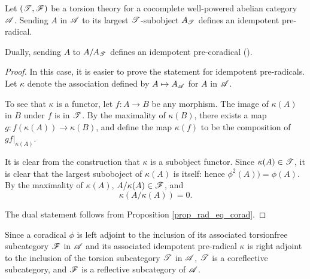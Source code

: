 \begin{prop}\label{prop_tt_to_corad}
  Let $(\mathscr{T}, \mathscr{F})$ be a torsion theory for a cocomplete
  well-powered abelian category $\mathscr{A}$.  Sending $A$ in $\mathscr{A}$
  to its largest $\mathscr{T}$-subobject $A_{\mathscr{T}}$ defines an
  idempotent pre-radical.

Dually, sending $A$ to $A/A_{\mathscr{T}}$ defines an idempotent 
pre-coradical (\CF \cite[I2.8]{BJV}).
\end{prop}
\begin{proof}
In this case, it is easier to prove the statement for idempotent 
pre-radicals. Let $\kappa$ denote the association defined by $A 
\mapsto A_{\mathscr{A}}$ for $A$ in $\mathscr{A}$.

To see that $\kappa$ is a functor, let $f: A \to B$ be any 
morphism. The image of $\kappa(A)$ in $B$ under $f$ is in 
$\mathscr{T}$. By the maximality of $\kappa(B)$, there exists a map 
$g: f(\kappa(A)) \to \kappa(B)$, and define the map $\kappa(f)$ 
to be the composition of $g f|_{\kappa(A)}$.

It is clear from the construction that $\kappa$ is a subobject 
functor. Since $\kappa(A) \in \mathscr{T}$, it is clear that the 
largest suboboject of $\kappa(A)$ is itself: hence $\phi^2(A)) = 
\phi(A)$. By the maximality of $\kappa(A)$, $A/\kappa(A) \in 
\mathscr{F}$, and 
\[
\kappa(A/\kappa(A)) = 0.
\]

The dual statement follows from Proposition \ref{prop_rad_eq_corad}.
\end{proof}

\begin{rmk}
Since a coradical $\phi$ is left adjoint to the inclusion of its 
associated torsionfree subcategory $\mathscr{F}$ in $\mathscr{A}$ and its 
associated idempotent pre-radical $\kappa$ is right adjoint to the
inclusion of the torsion subcategory $\mathscr{T}$ in $\mathscr{A}$, $\mathscr{T}$
is a coreflective subcategory, and $\mathscr{F}$ is a reflective 
subcategory of $\mathscr{A}$.
\end{rmk}

